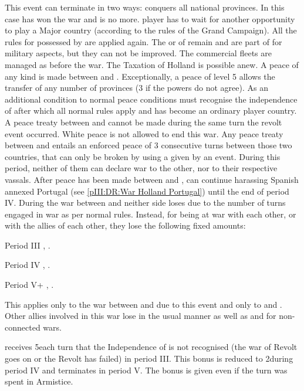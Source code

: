 \phpaix
\aparag This event can terminate in two ways:
\bparag \SPA conquers all \HOL national provinces. In this case \SPA has won
the war and \HOL is no more. \MAJHOL player has to wait for another
opportunity to play a Major country (according to the rules of the Grand
Campaign).  All the rules for \paysHollande possessed by \SPA are applied
again. The \COL or \TP of \paysHollande remain and are part of \SPA for
military aspects, but they can not be improved. The commercial fleets are
managed as before the war. The Taxation of Holland is possible anew.
\bparag A peace of any kind is made between \SPA and \HOL. Exceptionally, a
peace of level 5 allows the transfer of any number of provinces (3 if the
powers do not agree). As an additional condition to normal peace conditions
\SPA must recognise the independence of \HOL after which all normal rules
apply and \HOL has become an ordinary player country.
\aparag A peace treaty between \SPA and \HOL cannot be made during the same
turn the revolt event occurred.  White peace is not allowed to end this war.
\aparag Any peace treaty between \SPA and \HOL entails an enforced peace of 3
consecutive turns between those two countries, that can only be broken by
using a \CB given by an event.  During this period, neither of them can
declare war to the other, nor to their respective vassals.
\aparag After peace has been made between \HOL and \SPA, \HOL can continue
harassing Spanish annexed Portugal (see \ref{pIII:DR:War Holland Portugal})
until the end of period IV.
\aparag During the war between \HOL and \SPA neither side loses \STAB due to
the number of turns engaged in war as per normal rules. Instead, for being at
war with each other, or with the allies of each other, they lose the following
fixed amounts:
\begin{modlist}
\item[Period III]  \STAB,  \STAB.
\item[Period IV]  \STAB,  \STAB.
\item[Period V+]  \STAB,  \STAB.
\end{modlist}
\aparag This applies only to the war between \HOL and \SPA due to this event
and only to \SPA and \HOL.  Other allies involved in this war lose \STAB in
the usual manner as well as \HOL and \SPA for non-connected wars.

\phinter
\aparag \SPA receives 5\VP each turn that the Independence of \HOL is not
recognised (the war of Revolt goes on or the Revolt has failed) in period III.
This bonus is reduced to 2\VP during period IV and terminates in period V. The
bonus is given even if the turn was spent in Armistice.


